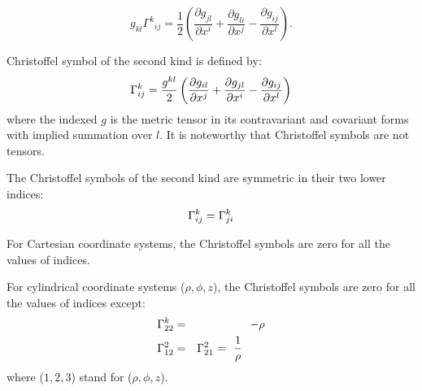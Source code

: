 \[g_{kl} \Gamma^k{}_{ij} = \dfrac{1}{2} \left( \dfrac{\partial g_{jl}}{\partial x^i} + \dfrac{\partial g_{li}}{\partial x^j}- \dfrac{\partial g_{ij}}{\partial x^l}\right).\]





\begin{df}
 Christoffel symbol of the second kind is defined by:
\begin{equation}
\Gamma_{ij}^{k} =\dfrac{g^{kl}}{2}\left(\dfrac{\partial g_{il}}{\partial 
x^{j}}+\dfrac{\partial g_{jl}}{\partial x^{i}}-\dfrac{\partial g_{ij}}{\partial 
x^{l}}\right)
\end{equation}
where the indexed $g$ is the metric tensor in its contravariant and
covariant forms with implied summation over $l$. It is noteworthy
that Christoffel symbols are not tensors.
\end{df}

 
 The Christoffel symbols of the second kind are symmetric
in their two lower indices:
\begin{equation}
\Gamma_{ij}^{k}=\Gamma_{ji}^{k}
\end{equation}

\begin{example}
 For Cartesian coordinate systems, the Christoffel symbols
are zero for all the values of indices.
\end{example}

 \begin{example}
 For cylindrical coordinate systems ($\rho,\phi,z$), the
Christoffel symbols are zero for all the values of indices except:
\begin{eqnarray}
\Gamma_{22}^{k} & = & -\rho\\
\Gamma_{12}^{2} & = & \begin{aligned}\Gamma_{21}^{2} & 
\begin{aligned}\,\,=\,\,\,\, & \dfrac{1}{\rho}\end{aligned}
\end{aligned}
\nonumber
\end{eqnarray}
where ($1,2,3$) stand for ($\rho,\phi,z$). 
 \end{example}

